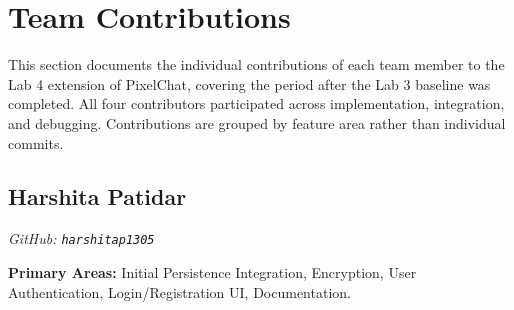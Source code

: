 \documentclass[12pt, a4paper]{article}
\begin{document}
\section{Team Contributions}

This section documents the individual contributions of each team member to the Lab 4 extension of PixelChat, covering the period after the Lab 3 baseline was completed. All four contributors participated across implementation, integration, and debugging. Contributions are grouped by feature area rather than individual commits.


\subsection{Harshita Patidar}
\textit{GitHub: \texttt{harshitap1305}}

\textbf{Primary Areas:} Initial Persistence Integration, Encryption, User Authentication, Login/Registration UI, Documentation.
\end{document}
